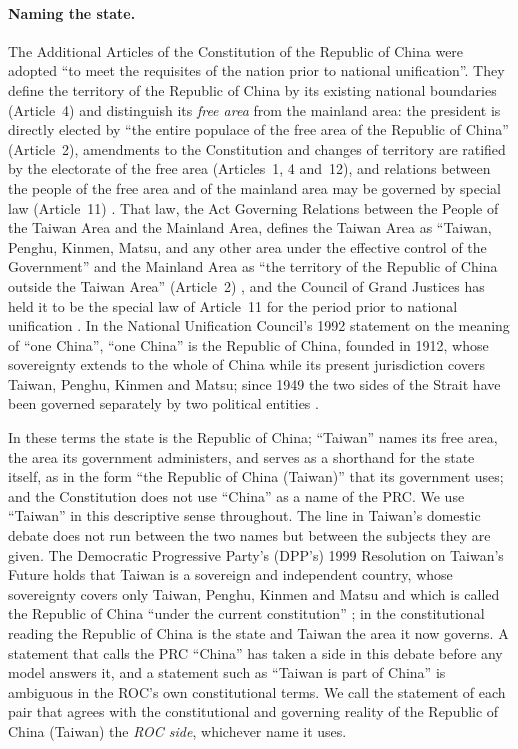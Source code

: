 \documentclass[11pt,a4paper]{article}
\begin{document}
\paragraph{Naming the state.}\label{sec:naming}
The Additional Articles of the Constitution of the Republic of China were adopted ``to meet the requisites of the
nation prior to national unification''. They define the territory of the Republic of China by its existing national
boundaries (Article~4) and distinguish its \emph{free area} from the mainland area: the president is directly elected
by ``the entire populace of the free area of the Republic of China'' (Article~2), amendments to the Constitution and
changes of territory are ratified by the electorate of the free area (Articles~1, 4 and~12), and relations between the
people of the free area and of the mainland area may be governed by special law (Article~11)
\citep{roc2005additional}. That law, the Act Governing Relations between the People of the Taiwan Area and the
Mainland Area, defines the Taiwan Area as ``Taiwan, Penghu, Kinmen, Matsu, and any other area under the effective
control of the Government'' and the Mainland Area as ``the territory of the Republic of China outside the Taiwan Area''
(Article~2) \citep{roc1992crossstrait}, and the Council of Grand Justices has held it to be the special law of
Article~11 for the period prior to national unification \citep{jy618}. In the National Unification Council's 1992 statement on
the meaning of ``one China'', ``one China'' is the Republic of China, founded in 1912, whose sovereignty extends to
the whole of China while its present jurisdiction covers Taiwan, Penghu, Kinmen and Matsu; since 1949 the two sides of
the Strait have been governed separately by two political entities \citep{nuc1992onechina}.

In these terms the state is the Republic of China; ``Taiwan'' names its free area, the area its government
administers, and serves as a shorthand for the state itself, as in the form ``the Republic of China (Taiwan)'' that
its government uses; and the Constitution does not use ``China'' as a name of the PRC. We use ``Taiwan'' in this
descriptive sense throughout. The line in Taiwan's
domestic debate does not run between the two names but between the subjects they are given. The Democratic Progressive
Party's (DPP's) 1999 Resolution on Taiwan's Future holds that Taiwan is a sovereign and independent country, whose sovereignty
covers only Taiwan, Penghu, Kinmen and Matsu and which is called the Republic of China ``under the current
constitution'' \citep{dpp1999resolution}; in the constitutional reading the Republic of China is the state and Taiwan
the area it now governs. A statement that calls the PRC ``China'' has taken a side in this debate before any model
answers it, and a statement such as ``Taiwan is part of China'' is ambiguous in the ROC's own constitutional terms. We
call the statement of each pair that agrees with the constitutional and governing reality of the Republic of China
(Taiwan) the \emph{ROC side}, whichever name it uses.
\end{document}
